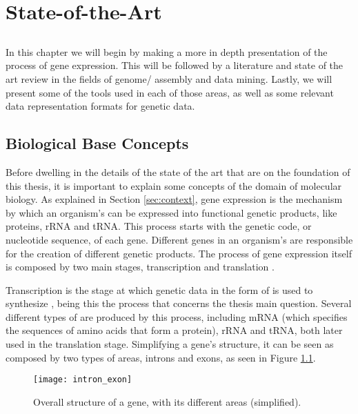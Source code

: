 \chapter{State-of-the-Art} \label{chap:sota}

\section*{}

In this chapter we will begin by making a more in depth presentation of the
process of gene expression. This will be followed by a literature and state of
the art review in the fields of genome/\trans{} assembly and data mining.
Lastly, we will present some of the tools used in each of those areas, as well
as some relevant data representation formats for genetic data.

\section{Biological Base Concepts}

Before dwelling in the details of the state of the art that are on the
foundation of this thesis, it is important to explain some concepts of the
domain of molecular biology. As explained in Section \ref{sec:context}, gene
expression is the mechanism by which an organism's \dna{} can be expressed into
functional genetic products, like proteins, rRNA and tRNA. This process starts
with the genetic code, or nucleotide sequence, of each gene. Different genes in
an organism's \dna{} are responsible for the creation of different genetic
products. The process of gene expression itself is composed by two main stages,
transcription and translation \cite{leic:gene_expr}.

Transcription is the stage at which genetic data in the form of \dna{} is used
to synthesize \rna{}, being this the process that concerns the thesis main
question. Several different types of \rna{} are produced by this process,
including mRNA (which specifies the sequences of amino acids that form a
protein), rRNA and tRNA, both later used in the translation stage. Simplifying a
gene's structure, it can be seen as composed by two types of areas, introns and
exons, as seen in Figure \ref{fig:intron_exon}.

\begin{figure}[!htb]
  \begin{center}
    \leavevmode
    \texttt{[image: intron\_exon]}
    \caption[Overall structure of a gene]{Overall structure of a gene, with its different areas (simplified).}
    \label{fig:intron_exon}
  \end{center}
\end{figure}

